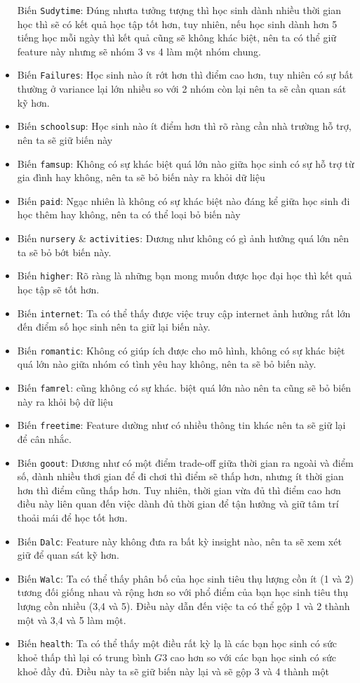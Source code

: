 \begin{itemize}
  Biến \texttt{Sudytime}: Đúng nhưta tưởng tượng thì học sinh dành nhiều
  thời gian học thì sẽ có kết quả học tập tốt hơn, tuy nhiên, nếu học
  sinh dành hơn 5 tiếng học mỗi ngày thì kết quả cũng sẽ không khác
  biệt, nên ta có thể giữ feature này nhưng sẽ nhóm 3 vs 4 làm một nhóm
  chung.
\item
  Biến \texttt{Failures}: Học sinh nào ít rớt hơn thì điểm cao hơn, tuy
  nhiên có sự bất thường ở variance lại lớn nhiều so với 2 nhóm còn lại
  nên ta sẽ cần quan sát kỹ hơn.
\item
  Biến \texttt{schoolsup}: Học sinh nào ít điểm hơn thì rõ ràng cần nhà
  trường hỗ trợ, nên ta sẽ giữ biến này
\item
  Biến \texttt{famsup}: Không có sự khác biệt quá lớn nào giữa học sinh
  có sự hỗ trợ từ gia đình hay không, nên ta sẽ bỏ biến này ra khỏi dữ
  liệu
\item
  Biến \texttt{paid}: Ngạc nhiên là không có sự khác biệt nào đáng kể
  giữa học sinh đi học thêm hay không, nên ta có thể loại bỏ biến này
\item
  Biến \texttt{nursery} \& \texttt{activities}: Dương như không có gì
  ảnh hưởng quá lớn nên ta sẽ bỏ bớt biến này.
\item
  Biến \texttt{higher}: Rõ ràng là những bạn mong muốn được học đại học
  thì kết quả học tập sẽ tốt hơn.
\item
  Biến \texttt{internet}: Ta có thể thấy được việc truy cập internet ảnh
  hưởng rất lớn đến điểm số học sinh nên ta giữ lại biến này.
\item
  Biến \texttt{romantic}: Không có giúp ích được cho mô hình, không có
  sự khác biệt quá lớn nào giữa nhóm có tình yêu hay không, nên ta sẽ bỏ
  biến này.
\item
  Biến \texttt{famrel}: cũng không có sự khác. biệt quá lớn nào nên ta
  cũng sẽ bỏ biến này ra khỏi bộ dữ liệu
\item
  Biến \texttt{freetime}: Feature dường như có nhiều thông tin khác nên
  ta sẽ giữ lại để cân nhắc.
\item
  Biến \texttt{goout}: Dương như có một điểm trade-off giữa thời gian ra
  ngoài và điểm số, dành nhiều thơi gian để đi chơi thì điểm sẽ thấp
  hơn, nhưng ít thời gian hơn thì điểm cũng thấp hơn. Tuy nhiên, thời
  gian vừa đủ thì điểm cao hơn điều này liên quan đến việc dành đủ thời
  gian để tận hưởng và giữ tâm trí thoải mái để học tốt hơn.
\item
  Biến \texttt{Dalc}: Feature này không đưa ra bất kỳ insight nào, nên
  ta sẽ xem xét giữ để quan sát kỹ hơn.
\item
  Biến \texttt{Walc}: Ta có thể thấy phân bố của học sinh tiêu thụ lượng
  cồn ít (1 và 2) tương đối giống nhau và rộng hơn so với phổ điểm của
  bạn học sinh tiêu thụ lượng cồn nhiều (3,4 và 5). Điều này dẫn đến
  việc ta có thể gộp 1 và 2 thành một và 3,4 và 5 làm một.
\item
  Biến \texttt{health}: Ta có thể thấy một điều rất kỳ lạ là các bạn học
  sinh có sức khoẻ thấp thì lại có trung bình \(G3\) cao hơn so với các
  bạn học sinh có sức khoẻ đầy đủ. Điều này ta sẽ giữ biến này lại và sẽ
  gộp 3 và 4 thành một
\end{itemize}

